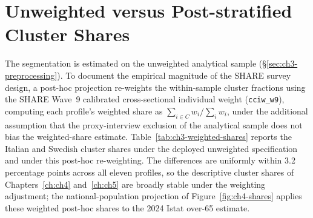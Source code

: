\chapter{Unweighted versus Post-stratified Cluster Shares}
\label{ch:appx-weighted-shares}

The segmentation is estimated on the unweighted analytical sample (\S\ref{sec:ch3-preprocessing}). To document the empirical magnitude of the SHARE survey design, a post-hoc projection re-weights the within-sample cluster fractions using the SHARE Wave~9 calibrated cross-sectional individual weight (\texttt{cciw\_w9}), computing each profile's weighted share as $\sum_{i \in C} w_i / \sum_i w_i$, under the additional assumption that the proxy-interview exclusion of the analytical sample does not bias the weighted-share estimate. Table~\ref{tab:ch3-weighted-shares} reports the Italian and Swedish cluster shares under the deployed unweighted specification and under this post-hoc re-weighting. The differences are uniformly within 3.2 percentage points across all eleven profiles, so the descriptive cluster shares of Chapters~\ref{ch:ch4} and~\ref{ch:ch5} are broadly stable under the weighting adjustment; the national-population projection of Figure~\ref{fig:ch4-shares} applies these weighted post-hoc shares to the 2024 Istat over-65 estimate.

